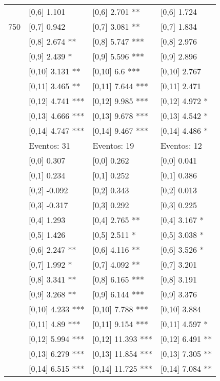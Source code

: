 \begin{table}
\begin{tabular}[t]{llll}
 & {}[0,6] 1.101 & {}[0,6] 2.701 ** & {}[0,6] 1.724\\
750 & {}[0,7] 0.942 & {}[0,7] 3.081 ** & {}[0,7] 1.834\\
\addlinespace
 & {}[0,8] 2.674 ** & {}[0,8] 5.747 *** & {}[0,8] 2.976\\
 & {}[0,9] 2.439 * & {}[0,9] 5.596 *** & {}[0,9] 2.896\\
 & {}[0,10] 3.131 ** & {}[0,10] 6.6 *** & {}[0,10] 2.767\\
 & {}[0,11] 3.465 ** & {}[0,11] 7.644 *** & {}[0,11] 2.471\\
 & {}[0,12] 4.741 *** & {}[0,12] 9.985 *** & {}[0,12] 4.972 *\\
\addlinespace
 & {}[0,13] 4.666 *** & {}[0,13] 9.678 *** & {}[0,13] 4.542 *\\
 & {}[0,14] 4.747 *** & {}[0,14] 9.467 *** & {}[0,14] 4.486 *\\
 & Eventos:  31 & Eventos:  19 & Eventos:  12\\
 & {}[0,0] 0.307 & {}[0,0] 0.262 & {}[0,0] 0.041\\
 & {}[0,1] 0.234 & {}[0,1] 0.252 & {}[0,1] 0.386\\
\addlinespace
 & {}[0,2] -0.092 & {}[0,2] 0.343 & {}[0,2] 0.013\\
 & {}[0,3] -0.317 & {}[0,3] 0.292 & {}[0,3] 0.225\\
 & {}[0,4] 1.293 & {}[0,4] 2.765 ** & {}[0,4] 3.167 *\\
 & {}[0,5] 1.426 & {}[0,5] 2.511 * & {}[0,5] 3.038 *\\
 & {}[0,6] 2.247 ** & {}[0,6] 4.116 ** & {}[0,6] 3.526 *\\
\addlinespace
1000 & {}[0,7] 1.992 * & {}[0,7] 4.092 ** & {}[0,7] 3.201\\
 & {}[0,8] 3.341 ** & {}[0,8] 6.165 *** & {}[0,8] 3.191\\
 & {}[0,9] 3.268 ** & {}[0,9] 6.144 *** & {}[0,9] 3.376\\
 & {}[0,10] 4.233 *** & {}[0,10] 7.788 *** & {}[0,10] 3.884\\
 & {}[0,11] 4.89 *** & {}[0,11] 9.154 *** & {}[0,11] 4.597 *\\
\addlinespace
 & {}[0,12] 5.994 *** & {}[0,12] 11.393 *** & {}[0,12] 6.491 **\\
 & {}[0,13] 6.279 *** & {}[0,13] 11.854 *** & {}[0,13] 7.305 **\\
 & {}[0,14] 6.515 *** & {}[0,14] 11.725 *** & {}[0,14] 7.084 **\\
\bottomrule
\end{tabular}
\end{table}
